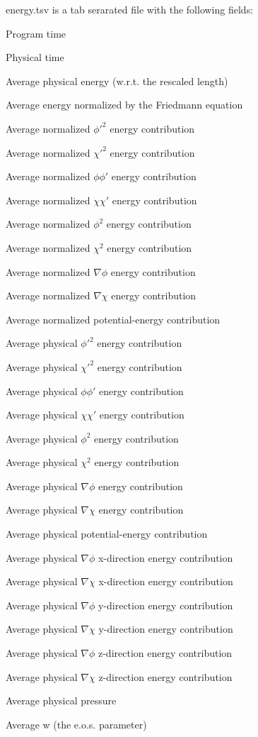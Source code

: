 energy.tsv is a tab serarated file with the following fields:

\begin{DoxyItemize}
\item Program time \item Physical time \item Average physical energy (w.r.t. the rescaled length) \item Average energy normalized by the Friedmann equation \item Average normalized $ \phi'^2 $ energy contribution \item Average normalized $ \chi'^2 $ energy contribution \item Average normalized $ \phi\phi' $ energy contribution \item Average normalized $ \chi\chi' $ energy contribution \item Average normalized $ \phi^2 $ energy contribution \item Average normalized $ \chi^2 $ energy contribution \item Average normalized $ \nabla \phi $ energy contribution \item Average normalized $ \nabla \chi $ energy contribution \item Average normalized potential-\/energy contribution \item Average physical $ \phi'^2 $ energy contribution \item Average physical $ \chi'^2 $ energy contribution \item Average physical $ \phi\phi' $ energy contribution \item Average physical $ \chi\chi' $ energy contribution \item Average physical $ \phi^2 $ energy contribution \item Average physical $ \chi^2 $ energy contribution \item Average physical $ \nabla \phi $ energy contribution \item Average physical $ \nabla \chi $ energy contribution \item Average physical potential-\/energy contribution \item Average physical $ \nabla \phi $ x-\/direction energy contribution \item Average physical $ \nabla \chi $ x-\/direction energy contribution \item Average physical $ \nabla \phi $ y-\/direction energy contribution \item Average physical $ \nabla \chi $ y-\/direction energy contribution \item Average physical $ \nabla \phi $ z-\/direction energy contribution \item Average physical $ \nabla \chi $ z-\/direction energy contribution \item Average physical pressure \item Average w (the e.o.s. parameter) \end{DoxyItemize}
